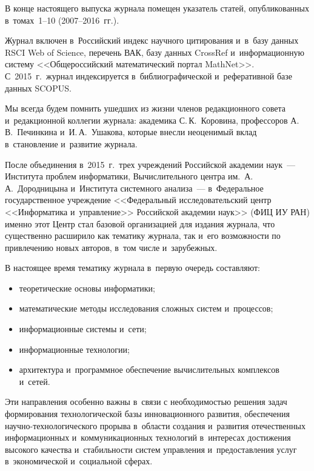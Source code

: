 {{{В конце настоящего выпуска журнала помещен указатель статей, 
опуб\-ли\-ко\-ван\-ных в~томах~1--10 (2007--2016~гг.).

Журнал включен в~Российский индекс научного цитирования и~в~базу 
данных RSCI Web of Science, перечень ВАК, базу данных CrossRef 
и~информационную систему <<Общероссийский математический портал MathNet>>. 
С~2015~г.\ журнал индексируется в~библиографической и~реферативной базе 
данных SCOPUS.

Мы всегда будем помнить ушедших из жизни членов редакционного совета 
и~редакционной коллегии журнала: академика С.\,К.~Коровина, профессоров 
А.\,В.~Печинкина и~И.\,А.~Ушакова, которые внесли неоценимый вклад в~становление 
и~развитие журнала.

После объединения в~2015~г.\ трех учреждений Российской академии наук~--- 
Института проблем информатики, Вычислительного центра им.\ А.\,А.~Дородницына 
и~Института системного анализа~--- в~Федеральное государственное учреждение 
<<Федеральный исследовательский центр <<Информатика и~управ\-ле\-ние>> 
Российской академии наук>> (ФИЦ ИУ РАН) именно этот Центр стал базовой организацией 
для издания журнала, что существенно расширило как тематику журнала, 
так и~его возможности по привлечению новых авторов, в~том числе и~зарубежных.

В настоящее время тематику журнала в~первую очередь составляют:
\begin{itemize}
\item    теоретические основы информатики;\\[-14.5pt] 
\item    математические методы исследования сложных систем и~процессов;\\[-14.5pt]
\item    информационные системы и~сети;\\[-14.5pt]
\item    информационные технологии;\\[-14.5pt]
\item    архитектура и~программное обеспечение вычислительных комплексов и~сетей. 
\end{itemize}

Эти направления особенно важны в~связи с необходимостью решения задач 
формирования технологической базы инновационного развития, обеспечения 
на\-уч\-но-тех\-но\-ло\-ги\-че\-ско\-го прорыва в~области создания и~развития 
отечественных информационных и~коммуникационных технологий в~интересах 
достижения высокого качества и~стабильности систем управления и~предоставления 
услуг в~экономической и~социальной сферах. 

}}}
